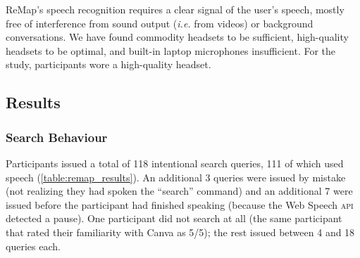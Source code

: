 ReMap's speech recognition requires a clear signal of the user's speech, mostly free of interference from sound output (\textit{i.e.} from videos) or background conversations. We have found commodity headsets to be sufficient, high-quality headsets to be optimal, and built-in laptop microphones insufficient. For the study, participants wore a high-quality headset.

\subsection{Results}
\subsubsection{Search Behaviour}
Participants issued a total of 118 intentional search queries, 111 of which used speech (\autoref{table:remap_results}). An additional 3 queries were issued by mistake (not realizing they had spoken the ``search'' command) and an additional 7 were issued before the participant had finished speaking (because the Web Speech \textsc{api} detected a pause). One participant did not search at all (the same participant that rated their familiarity with Canva as 5/5); the rest issued between 4 and 18 queries each. 

